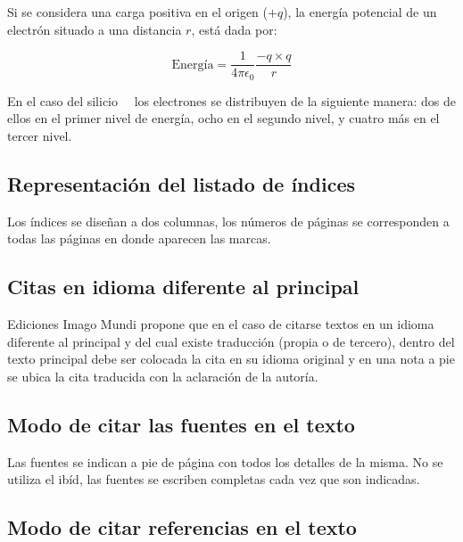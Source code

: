 \documentclass{book}
\begin{document}
{{{{{{{{\begin{mdframed}[linewidth=.5pt,linecolor=black!30,roundcorner=3pt,backgroundcolor=yellow!15]
\indent Si se considera una carga positiva en el origen ($+q$), la energía potencial de un electrón situado a una distancia $r$, está dada por:

\begin{equation}
\mbox{Energía}=\dfrac{1}{4 \pi \epsilon_0} \dfrac{-q \times q}{r}
\end{equation}

En el caso del silicio \ \rdash \ los electrones se distribuyen de la siguiente manera: dos de ellos en el primer nivel de energía, ocho en el segundo nivel, y cuatro más en el tercer nivel.
\end{mdframed}

\subsection{Representación del listado de índices}

Los índices se diseñan a dos columnas, los números de páginas se corresponden a todas las páginas en donde aparecen las marcas.

\subsection{Citas en idioma diferente al principal}

Ediciones Imago Mundi propone que en el caso de citarse textos en un idioma diferente al principal y del cual existe traducción (propia o de tercero), dentro del texto principal debe ser colocada la cita en su idioma original y en una nota a pie se ubica la cita traducida con la aclaración de la autoría.

\subsection{Modo de citar las fuentes en el texto}

Las fuentes se indican a pie de página con todos los detalles de la misma. No se utiliza el ibíd, las fuentes se escriben completas cada vez que son indicadas.

\subsection{Modo de citar referencias en el texto}

}}}}}}}}
\end{document}
